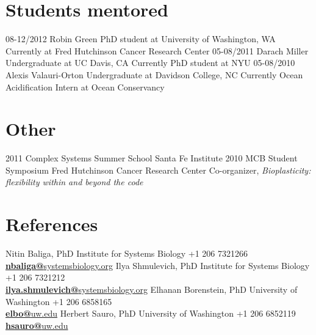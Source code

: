 \documentclass[]{friggeri-cv}
\begin{document}
\section{Students mentored}
\begin{entrylist}
  \entry
    {08-12/2012}
    {Robin Green}
    {PhD student at University of Washington, WA}
    {Currently at Fred Hutchinson Cancer Research Center}
  \entry
    {05-08/2011}
    {Darach Miller}
    {Undergraduate at UC Davis, CA}
    {Currently PhD student at NYU}
  \entry
    {05-08/2010}
    {Alexis Valauri-Orton}
    {Undergraduate at Davidson College, NC}
    {Currently ‎Ocean Acidification Intern at Ocean Conservancy}
\end{entrylist}

\section{Other}
\begin{entrylist}
 \entry
    {2011}
    {Complex Systems Summer School}
    {Santa Fe Institute}
    {}
  \entry
    {2010}
    {MCB Student Symposium}
    {Fred Hutchinson Cancer Research Center}
    {Co-organizer, \emph{Bioplasticity: flexibility within and beyond the code}}
\end{entrylist}
\newpage
\section{References}
\begin{entrylist}
 \entry
    {}
    {Nitin Baliga, PhD}
    {Institute for Systems Biology}
    {+1 206 7321266\\
    \href{mailto:nbaliga@systemsbiology.org}{\textbf{nbaliga@}systemsbiology.org}}
     \entry
    {}
    {Ilya Shmulevich, PhD}
    {Institute for Systems Biology}
    {+1 206 7321212\\
    \href{mailto:ilya.shmulevich@systemsbiology.org}{\textbf{ilya.shmulevich@}systemsbiology.org}}
     \entry
    {}
    {Elhanan Borenstein, PhD}
    {University of Washington}
    {+1 206 6858165\\
    \href{mailto:elbo@uw.edu}{\textbf{elbo@}uw.edu}}
    \entry
    {}
    {Herbert Sauro, PhD}
    {University of Washington}
    {+1 206 6852119\\
    \href{mailto:hsauro@uw.edu}{\textbf{hsauro@}uw.edu}}
\end{entrylist}
\end{document}
